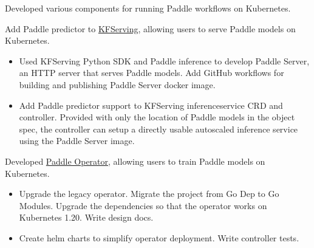 
Developed various components for running Paddle workflows on Kubernetes.

\begin{miniItemize}
    \item Add Paddle predictor to \href{https://github.com/kubeflow/kfserving}{KFServing}, allowing users to serve Paddle models on Kubernetes.
    \begin{itemize}[after=\vspace{0ex}]
        \item Used KFServing Python SDK and Paddle inference to develop Paddle Server, an HTTP server that serves Paddle models. Add GitHub workflows for building and publishing Paddle Server docker image.
        \item Add Paddle predictor support to KFServing inferenceservice CRD and controller. Provided with only the location of Paddle models in the object spec, the controller can setup a directly usable autoscaled inference service using the Paddle Server image.
    \end{itemize}
    \item Developed \href{https://github.com/PaddleFlow/paddle-operator}{Paddle Operator}, allowing users to train Paddle models on Kubernetes.
    \begin{itemize}[after=\vspace{0ex}]
        \item Upgrade the legacy operator. Migrate the project from Go Dep to Go Modules. Upgrade the dependencies so that the operator works on Kubernetes 1.20. Write design docs.
        \item Create helm charts to simplify operator deployment. Write controller tests.
    \end{itemize}
\end{miniItemize}
